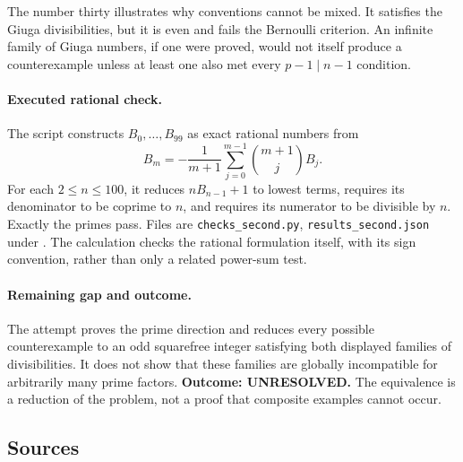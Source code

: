 \documentclass[11pt,a4paper]{article}
\begin{document}
The number thirty illustrates why conventions cannot be mixed.
It satisfies the Giuga divisibilities, but it is even and fails the
Bernoulli criterion. An infinite family of Giuga numbers, if one were
proved, would not itself produce a counterexample unless at least one
also met every $p-1\mid n-1$ condition.

\paragraph{Executed rational check.}
The script constructs $B_0,\ldots,B_{99}$ as exact rational numbers
from
\[
 B_m=-\frac1{m+1}\sum_{j=0}^{m-1}\binom{m+1}{j}B_j.
\]
For each $2\le n\le100$, it reduces $nB_{n-1}+1$ to lowest terms,
requires its denominator to be coprime to $n$, and requires its numerator
to be divisible by $n$. Exactly the primes pass. Files are
\texttt{checks\_second.py}, \texttt{results\_second.json} under
.
The calculation checks the rational formulation itself, with its sign
convention, rather than only a related power-sum test.

\paragraph{Remaining gap and outcome.}
The attempt proves the prime direction and reduces every possible
counterexample to an odd squarefree integer satisfying both displayed
families of divisibilities. It does not show that these families are
globally incompatible for arbitrarily many prime factors.
\textbf{Outcome: UNRESOLVED.} The equivalence is a reduction of the
problem, not a proof that composite examples cannot occur.

\subsection{Sources}
\end{document}
